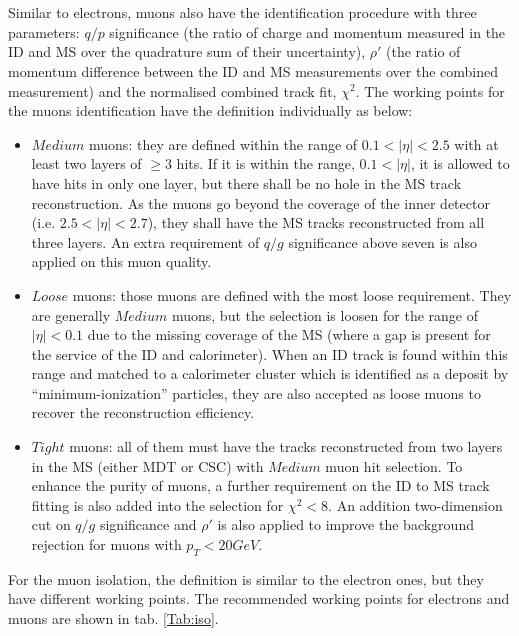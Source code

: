 \\
\\Similar to electrons, muons also have the identification procedure with three parameters: $q/p$ significance (the ratio of charge and momentum measured in the ID and MS over the quadrature sum of their uncertainty), $\rho'$ (the ratio of momentum difference between the ID and MS measurements over the combined measurement) and the normalised combined track fit, $\chi^2$. The working points for the muons identification have the definition individually as below:
\begin{itemize}
	\item $Medium$ muons: they are defined within the range of $0.1<|\eta|<2.5$ with at least two layers of $\geq 3$ hits. If it is within the range, $0.1<|\eta|$, it is allowed to have hits in only one layer, but there shall be no hole in the MS track reconstruction. As the muons go beyond the coverage of the inner detector (i.e. $2.5<|\eta|<2.7$), they shall have the MS tracks reconstructed from all three layers. An extra requirement of $q/g$ significance above seven is also applied on this muon quality. 
	\item $Loose$ muons: those muons are defined with the most loose requirement. They are generally $Medium$ muons, but the selection is loosen for the range of $|\eta|<0.1$ due to the missing coverage of the MS (where a gap is present for the service of the ID and calorimeter). When an ID track is found within this range and matched to a calorimeter cluster which is identified as a deposit by ``minimum-ionization'' particles, they are also accepted as loose muons to recover the reconstruction efficiency. 
	\item $Tight$ muons: all of them must have the tracks reconstructed from two layers in the MS (either MDT or CSC) with $Medium$ muon hit selection. To enhance the purity of muons, a further requirement on the ID to MS track fitting is also added into the selection for $\chi^2<8$. An addition two-dimension cut on $q/g$ significance and $\rho'$ is also applied to improve the background rejection for muons with $p_{T}<20GeV$.
\end{itemize}
For the muon isolation, the definition is similar to the electron ones, but they have different working points. The recommended working points for electrons and muons are shown in tab. \ref{Tab:iso}.

